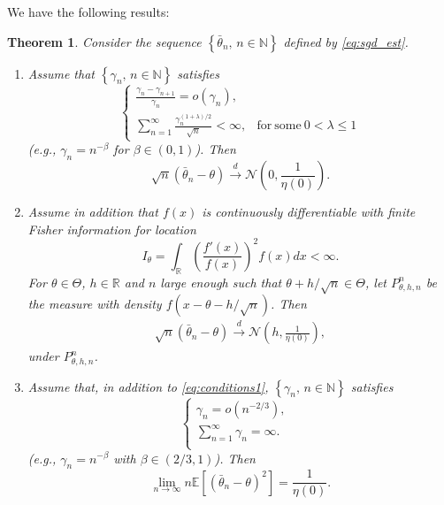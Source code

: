 \documentclass[letterpaper, 11pt]{IEEEtran}      %
\newtheorem{thm}{\bf{Theorem}}
\newcommand{\ex}[1]{\ensuremath{\mathbb{E}\left[ #1\right]}}
\newcommand{\Ncal}{\mathcal{N}}
\begin{document}
We have the following results:
\begin{thm} \label{thm:sgd}
Consider the sequence $\left\{\bar{\theta}_n,\, n\in \mathbb N \right\}$ defined by \eqref{eq:sgd_est}. 
\begin{enumerate}
\item[(i)] Assume that $\left\{ \gamma_n,\, n\in \mathbb N \right\}$ satisfies
\begin{equation} \label{eq:conditions1}
\begin{cases}
\frac{\gamma_n - \gamma_{n+1}}{\gamma_n} = o(\gamma_n), &  \\
\sum_{n=1}^\infty \frac{\gamma_n^{(1+\lambda)/2}} {\sqrt{n}} < \infty, & 
\mathrm{for~some~}0< \lambda \leq 1
\end{cases}
\end{equation}
(e.g., $\gamma_n = n^{-\beta}$ for $\beta \in (0,1)$). Then
\[
\sqrt{n}\left( \bar{\theta}_n - \theta\right) \overset{d}{\to} \Ncal\left(0,\frac{1}{\eta(0)}\right).
\]
\item [(ii)] Assume in addition that $f(x)$ is continuously differentiable with finite Fisher information for location
\[
I_\theta = \int_{\mathbb R} \left( \frac{f'(x)}{f(x)}  \right)^2 f(x) dx < \infty.
\]
For $\theta \in \Theta$, $h\in \mathbb R$ and $n$ large enough such that $\theta+h/\sqrt{n} \in \Theta$, let $P^n_{\theta,h,n}$ be the measure with density $f(x-\theta - h/\sqrt{n})$. Then 
\begin{align}
\label{eq:sgd_part2}
\sqrt{n}\left( \bar{\theta}_n - \theta\right) \overset{d}{\to} \Ncal\left( h,\frac{1}{\eta(0)}\right),
\end{align}
under $P^n_{\theta,h,n}$. 
\item[(iii)] Assume that, in addition to \eqref{eq:conditions1}, $\left\{ \gamma_n,\, n\in \mathbb N \right\}$ satisfies
\begin{equation} \label{eq:conditions2}
\begin{cases}
\gamma_n = o(n^{-2/3}), &  \\
\sum_{n=1}^\infty \gamma_n = \infty.  & \\
\end{cases}
\end{equation}
(e.g., $\gamma_n = n^{-\beta}$ with $\beta \in (2/3,1)$). Then
\[
\lim_{n\to \infty} n \ex{\left( \bar{\theta}_n - \theta \right)^2} = \frac{1}{\eta(0)}. 
\]
\end{enumerate}
\end{thm}
\end{document}
